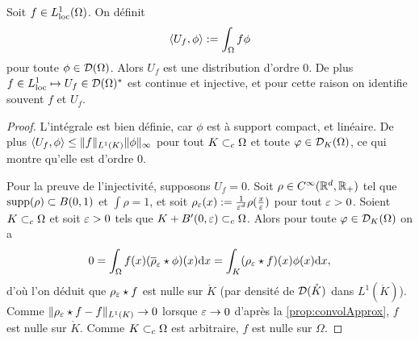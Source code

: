 \begin{proposition}
\label{prop:distribL1Loc}
%
Soit $f \in L^1_{\mathrm{loc}}(\Omega)$. On définit 
\begin{equation*}
	\langle U_f,\phi\rangle := \int_\Omega f \phi
\end{equation*}
pour toute $\phi \in \mathcal{D}(\Omega)$.
Alors $U_f$ est une distribution d'ordre $0$. De plus $f \in L^1_{\mathrm{loc}} \mapsto U_f \in \mathcal{D}(\Omega)^*$ est continue et injective, et pour cette raison on identifie souvent $f$ et $U_f$. 
\end{proposition}

\begin{proof}
L'intégrale est bien définie, car $\phi$ est à support compact, et linéaire.
De plus $\langle U_f,\phi\rangle \leq \|f\|_{L^1(K)} \|\phi\|_\infty$ pour tout $K \subset_c \Omega$ et toute $\varphi \in \mathcal{D}_K(\Omega)$, ce qui montre qu'elle est d'ordre $0$. 

Pour la preuve de l'injectivité, supposons $U_f = 0$. 
	Soit $\rho \in C^\infty(\mathbb{R}^d,\mathbb{R}_+)$ tel que $\operatorname{supp}(\rho) \subset B(0,1)$ et $\int \rho=1$, et soit $\rho_\varepsilon(x) := \frac 1 {\varepsilon^d} \rho(\frac x {\varepsilon})$ pour tout $\varepsilon>0$. 
	Soient $K \subset_c \Omega$ et soit $\varepsilon >0$ tels que $K + B'(0,\varepsilon) \subset_c \Omega$. Alors pour toute $\varphi \in \mathcal{D}_K(\Omega)$ on a 
	\begin{equation*}
		0 = \int_\Omega f(x) (\overline \rho_\varepsilon \star \phi) (x) \mathrm{d} x  = \int_K (\rho_\varepsilon \star f)(x) \phi(x) \mathrm{d} x,
	\end{equation*}
	d'où l'on déduit que $\rho_\varepsilon \star f$ est nulle sur $\mathring K$ (par densité de $\mathcal{D}(\mathring K)$ dans $L^1(\mathring K)$).
Comme $\|\rho_\varepsilon \star f - f\|_{L^1(K)} \to 0$ lorsque $\varepsilon\to 0$ d'après la \cref{prop:convolApprox}, $f$ est nulle sur $\mathring K$. Comme $K\subset_c \Omega$ est arbitraire, $f$ est nulle sur $\Omega$. 
\end{proof}

